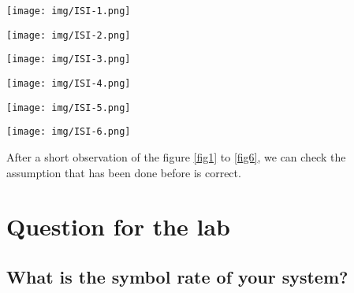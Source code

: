 \documentclass[frenchb, oneside, headings=normal]{scrartcl}
\begin{document}
    \begin{minipage}[b]{0.48\linewidth}
        \centering \texttt{[image: img/ISI-1.png]}
    
    \end{minipage}\hfill
    \begin{minipage}[b]{0.48\linewidth}
         \centering \texttt{[image: img/ISI-2.png]}
    \end{minipage}
    \begin{minipage}[b]{0.48\linewidth}
        \centering \texttt{[image: img/ISI-3.png]}
    
    \end{minipage}\hfill
    \begin{minipage}[b]{0.48\linewidth}
         \centering \texttt{[image: img/ISI-4.png]}
    \end{minipage}
    
    \begin{minipage}[b]{0.48\linewidth}
        \centering \texttt{[image: img/ISI-5.png]}
    
    \end{minipage}\hfill
    \begin{minipage}[b]{0.48\linewidth}
         \centering \texttt{[image: img/ISI-6.png]}
    \end{minipage}

After a short observation of the figure \ref{fig1} to \ref{fig6}, we can check the assumption that has been done before is correct. 


\newpage
\section{Question for the lab}

\subsection{What is the symbol rate of your system?}
\end{document}
